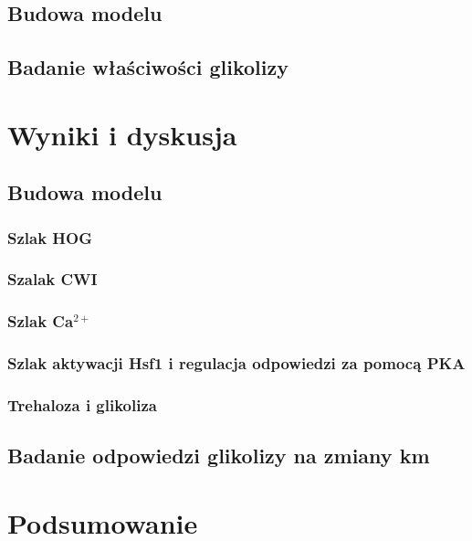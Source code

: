 \documentclass{pracamgr}
\begin{document}
\section{Budowa modelu}
\section{Badanie właściwości glikolizy}

\chapter{Wyniki i dyskusja}
\section{Budowa modelu}
\subsection{Szlak HOG}
\subsection{Szalak CWI}
\subsection{Szlak Ca$^{2+}$}
\subsection{Szlak aktywacji Hsf1 i regulacja odpowiedzi za pomocą PKA}
\subsection{Trehaloza i glikoliza}

\section{Badanie odpowiedzi glikolizy na zmiany km}



\chapter{Podsumowanie}





\end{document}
